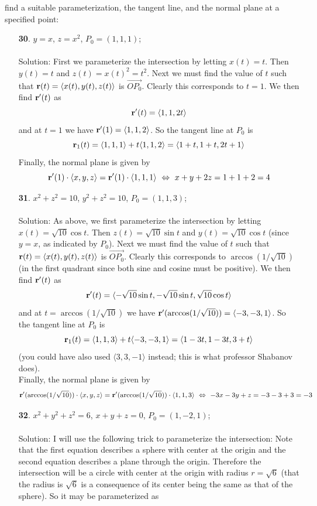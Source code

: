 \documentclass[12pt]{amsbook}
\newcommand{\la}{\langle}
\newcommand{\ra}{\rangle}
\begin{document}
find a suitable parameterization, the tangent line, and the normal plane at a specified point:
\begin{enumerate}
  \item[{\small\bf 30}.] $y=x$, $z=x^2$, $P_0=(1,1,1)$;
  \\
  \\
  {\sc Solution}: First we parameterize the intersection by letting $x(t)=t$. Then $y(t)=t$ and $z(t)=x(t)^2=t^2$. Next we must find the value of $t$ such that ${\bf r}(t)=\la x(t),y(t),z(t)\ra$ is $\overrightarrow{OP_0}$. Clearly this corresponds to $t=1$. We then find ${\bf r}'(t)$ as
  $${\bf r}'(t)=\la 1,1, 2t\ra$$
  and at $t=1$ we have ${\bf r}'(1)=\la 1,1,2\ra$. So the tangent line at $P_0$ is
  $${\bf r}_1(t)=\la 1,1,1 \ra + t\la 1,1,2\ra = \la 1+t,1+t,2t+1 \ra$$
  Finally, the normal plane is given by
  $${\bf r}'(1)\cdot\la x,y,z \ra={\bf r}'(1)\cdot\la 1,1,1 \ra \ \Leftrightarrow \ x+y+2z=1+1+2=4$$
  \item[{\small\bf 31}.] $x^2+z^2=10$, $y^2+z^2=10$, $P_0=(1,1,3)$;
  \\
  \\
  {\sc Solution}: As above, we first parameterize the intersection by letting $x(t)=\sqrt{10}\cos t$. Then $z(t)=\sqrt{10}\sin t$ and $y(t)=\sqrt{10}\cos t$ (since $y=x$, as indicated by $P_0$). Next we must find the value of $t$ such that ${\bf r}(t)=\la x(t),y(t),z(t)\ra$ is $\overrightarrow{OP_0}$. Clearly this corresponds to $\arccos(1/\sqrt{10})$ (in the first quadrant since both sine and cosine must be positive). We then find ${\bf r}'(t)$ as
  $${\bf r}'(t)=\la -\sqrt{10}\sin t,-\sqrt{10}\sin t, \sqrt{10}\cos t\ra$$
  and at $t=\arccos(1/\sqrt{10})$ we have ${\bf r}'(\arccos(1/\sqrt{10}))=\la -3,-3,1\ra$. So the tangent line at $P_0$ is
  $${\bf r}_1(t)=\la 1,1,3 \ra + t\la -3,-3,1\ra = \la 1-3t,1-3t,3+t \ra $$
  (you could have also used $\la 3,3,-1\ra$ instead; this is what professor Shabanov does). 
  \\
  Finally, the normal plane is given by
  $${\bf r}'(\arccos(1/\sqrt{10}))\cdot\la x,y,z \ra={\bf r}'(\arccos(1/\sqrt{10}))\cdot\la 1,1,3 \ra \ \Leftrightarrow \ -3x-3y+z=-3-3+3=-3$$
  \item[{\small\bf 32}.] $x^2+y^2+z^2=6$, $x+y+z=0$, $P_0=(1,-2,1)$;
  \\
  \\
  {\sc Solution}: I will use the following trick to parameterize the intersection: Note that the first equation describes a sphere with center at the origin and the second equation describes a plane through the origin. Therefore the intersection will be a circle with center at the origin with radius $r=\sqrt{6}$ (that the radius is $\sqrt{6}$ is a consequence of its center being the same as that of the sphere). So it may be parameterized as 

\end{enumerate}
\end{document}
